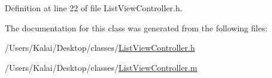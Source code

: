 Definition at line 22 of file List\-View\-Controller.\-h.



The documentation for this class was generated from the following files\-:\begin{DoxyCompactItemize}
\item 
/\-Users/\-Kalai/\-Desktop/classes/\hyperlink{_list_view_controller_8h}{List\-View\-Controller.\-h}\item 
/\-Users/\-Kalai/\-Desktop/classes/\hyperlink{_list_view_controller_8m}{List\-View\-Controller.\-m}\end{DoxyCompactItemize}
